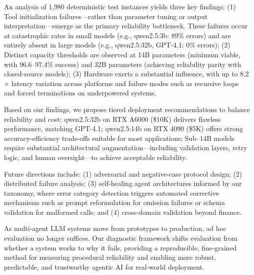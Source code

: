 \documentclass[conference]{IEEEtran}
\begin{document}
An analysis of 1,980 deterministic test instances yields three key findings:  
(1) Tool initialization failures—rather than parameter tuning or output interpretation—emerge as the primary reliability bottleneck. These failures occur at catastrophic rates in small models (e.g., qwen2.5:3b: 89\% errors) and are entirely absent in large models (e.g., qwen2.5:32b, GPT-4.1: 0\% errors);  
(2) Distinct capacity thresholds are observed at 14B parameters (minimum viable, with 96.6--97.4\% success) and 32B parameters (achieving reliability parity with closed-source models);  
(3) Hardware exerts a substantial influence, with up to 8.2$\times$ latency variation across platforms and failure modes such as recursive loops and forced terminations on underpowered systems.


Based on our findings, we propose tiered deployment recommendations to balance reliability and cost:  
qwen2.5:32b on RTX A6000 (\$10K) delivers flawless performance, matching GPT-4.1;  
qwen2.5:14b on RTX 4090 (\$5K) offers strong accuracy-efficiency trade-offs suitable for most applications;  
Sub--14B models require substantial architectural augmentation—including validation layers, retry logic, and human oversight—to achieve acceptable reliability.

Future directions include:  
(1) adversarial and negative-case protocol design;  
(2) distributed failure analysis; 
(3) self-healing agent architectures informed by our taxonomy, where error category detection triggers automated corrective mechanisms such as prompt reformulation for omission failures or schema validation for malformed calls; and  
(4) cross-domain validation beyond finance.

As multi-agent LLM systems move from prototypes to production, ad hoc evaluation no longer suffices. Our diagnostic framework shifts evaluation from whether a system works to why it fails, providing a reproducible, fine-grained method for measuring procedural reliability and enabling more robust, predictable, and trustworthy agentic AI for real-world deployment.
\end{document}
